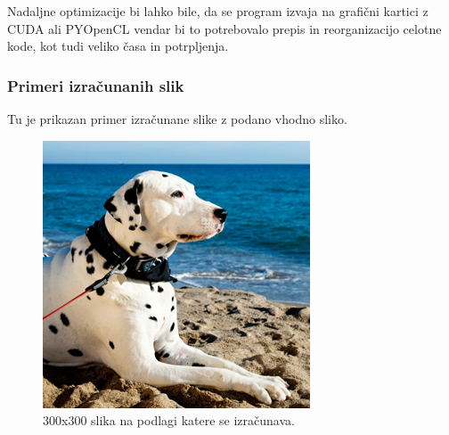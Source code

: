 \documentclass{egpubl}
\begin{document}
	Nadaljne optimizacije bi lahko bile, da se program izvaja na grafični kartici z CUDA ali PYOpenCL vendar bi to potrebovalo prepis in reorganizacijo celotne kode, kot tudi veliko časa in potrpljenja.
	
	\subsubsection{Primeri izračunanih slik}
	Tu je prikazan primer izračunane slike z podano vhodno sliko.
	
	\begin{figure}[!htb]
		\centering
		\parbox[t]{.7\columnwidth}{\relax
			\includegraphics[width=.95\linewidth]{300x300.jpg}
		}
		\caption{\label{fig:300x300_source}
			300x300 slika na podlagi katere se izračunava.}
	\end{figure}
\end{document}
